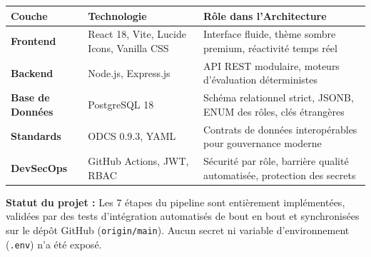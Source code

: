 \documentclass[11pt,a4paper]{article}
\begin{document}
\begin{center}
\small
\begin{tabularx}{\textwidth}{l p{5.5cm} X}
\toprule
\textbf{Couche} & \textbf{Technologie} & \textbf{Rôle dans l'Architecture} \\
\midrule
\textbf{Frontend} & React 18, Vite, Lucide Icons, Vanilla CSS & Interface fluide, thème sombre premium, réactivité temps réel \\
\textbf{Backend} & Node.js, Express.js & API REST modulaire, moteurs d'évaluation déterministes \\
\textbf{Base de Données} & PostgreSQL 18 & Schéma relationnel strict, JSONB, ENUM des rôles, clés étrangères \\
\textbf{Standards} & ODCS 0.9.3, YAML & Contrats de données interopérables pour gouvernance moderne \\
\textbf{DevSecOps} & GitHub Actions, JWT, RBAC & Sécurité par rôle, barrière qualité automatisée, protection des secrets \\
\bottomrule
\end{tabularx}
\end{center}

\vspace{10pt}
\begin{tcolorbox}[colback=darkbg, colframe=primary, fonttitle=\bfseries\color{white}, title=Bilan de Réalisation]
\color{white}
\textbf{Statut du projet :} Les 7 étapes du pipeline sont entièrement implémentées, validées par des tests d'intégration automatisés de bout en bout et synchronisées sur le dépôt GitHub (\texttt{origin/main}). Aucun secret ni variable d'environnement (\texttt{.env}) n'a été exposé.
\end{tcolorbox}
\end{document}
